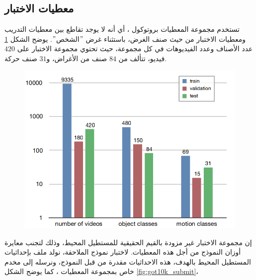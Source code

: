 \subsection{معطيات الاختبار
\label{section:got10k}}
تستخدم مجموعة المعطيات
بروتوكول
،
أي أنه لا يوجد تقاطع بين معطيات التدريب ومعطيات الاختبار من حيث صنف الغرض، باستثناء غرض $"$الشخص$"$.
\newline
يوضح الشكل 
\ref{fig:got10k_split}
عدد الأصناف وعدد الفيديوهات في كل مجموعة، حيث تحتوي مجموعة الاختبار على $420$ فيديو، تتألف من $84$ صنف من الأغراض، و$31$ صنف حركة.
\begin{figure}[!h]
	\centerline{\includegraphics[scale=0.4]{images/got10k_split}}
	\caption{
		}
	\label{fig:got10k_split}
\end{figure}
\newline
إن مجموعة الاختبار غير مزودة بالقيم الحقيقية للمستطيل المحيط، وذلك لتجنب معايرة أوزان النموذج من أجل هذه المعطيات.
لاختبار نموذج الملاحقة، نولد ملف بإحداثيات المستطيل المحيط بالهدف، هذه الاحداثيات مقدرة من قبل النموذج، ونرسله إلى مخدم خاص بمجموعة المعطيات
،
 كما يوضح الشكل
\ref{fig:got10k_submit}،
	
